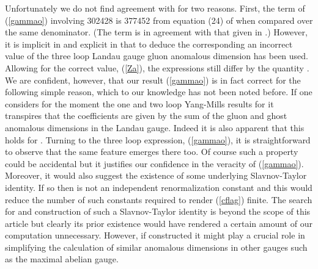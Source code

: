 \documentclass[a4paper,11pt]{article}
\providecommand{\Nf}{N_{\!f}}
\begin{document}
Unfortunately we do not find agreement with \cite{2} for two reasons. First, 
the term of (\ref{gammao}) involving 302428 is 377452 from equation (24) of 
\cite{2} when compared over the same denominator. (The term \coordHE{} is 
in agreement with that given in \cite{2}.) However, it is implicit in \cite{2} 
and explicit in \cite{16} that to deduce the corresponding \coordHE{} an 
incorrect value of the three loop Landau gauge gluon anomalous dimension has 
been used. Allowing for the correct value, (\ref{Za}), the expressions still 
differ by the quantity \coordHE{}. We are confident, however, that our result 
(\ref{gammao}) is in fact correct for the following simple reason, which to our
knowledge has not been noted before. If one considers for the moment the one 
and two loop Yang-Mills results for \myHighlight{$\alpha$}\coordHE{}  \myHighlight{$=$}\coordHE{}  \coordHE{} it transpires that the 
coefficients are given by the sum of the gluon and ghost anomalous dimensions 
in the Landau gauge. Indeed it is also apparent that this holds for \myHighlight{$\Nf$}\coordHE{} 
\myHighlight{$\neq$}\coordHE{}  \coordHE{}. Turning to the three loop expression, (\ref{gammao}), it is 
straightforward to observe that the same feature emerges there too. Of course 
such a property could be accidental but it justifies our confidence in the 
veracity of (\ref{gammao}). Moreover, it would also suggest the existence of 
some underlying Slavnov-Taylor identity. If so then \coordHE{} is not an 
independent renormalization constant and this would reduce the number of such 
constants required to render (\ref{cflag}) finite. The search for and 
construction of such a Slavnov-Taylor identity is beyond the scope of this 
article but clearly its prior existence would have rendered a certain amount of
our computation unnecessary. However, if constructed it might play a crucial 
role in simplifying the calculation of similar anomalous dimensions in other 
gauges such as the maximal abelian gauge.
\end{document}
